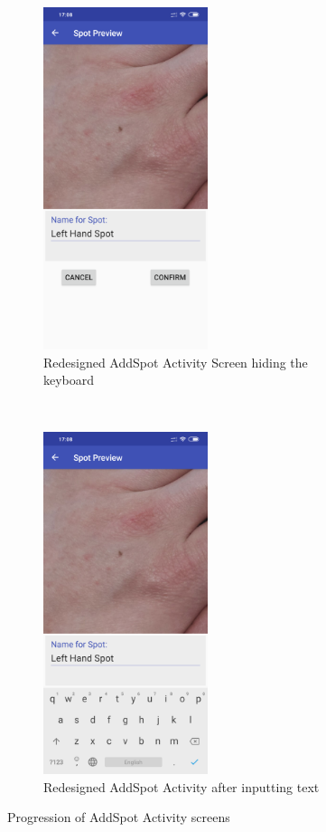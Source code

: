\begin{figure}[t!]
\begin{subfigure}[t]{0.5\textwidth}
        \centering
        \includegraphics[height=10cm]{figures/confirmadd1.png}
        \caption{Redesigned AddSpot Activity Screen hiding the keyboard}
        \label{subfig:newaddspotkeyboard}
    \end{subfigure}%
     ~
    \begin{subfigure}[t]{0.5\textwidth}
        \centering
        \includegraphics[height=10cm]{figures/addspot2.png}
        \caption{Redesigned AddSpot Activity after inputting text}
        \label{subfig:newaddspotnokeyboard}
    \end{subfigure}
    \caption{Progression of AddSpot Activity screens}
\end{figure}

